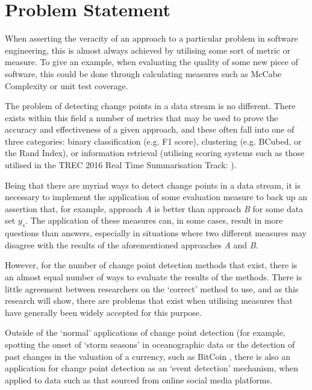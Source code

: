 \documentclass[../main.tex]{subfiles}
\begin{document}
\section{Problem Statement}
\label{Problem Statement}

When asserting the veracity of an approach to a particular problem in software engineering, this is almost always achieved by utilising some sort of metric or measure. To give an example, when evaluating the quality of some new piece of software, this could be done through calculating measures such as McCabe Complexity \cite{ThomasJ.McCabe1976} or unit test coverage.

The problem of detecting change points in a data stream is no different. There exists within this field a number of metrics that may be used to prove the accuracy and effectiveness of a given approach, and these often fall into one of three categories: binary classification (e.g. F1 score), clustering (e.g. BCubed, or the Rand Index), or information retrieval (utilising scoring systems such as those utilised in the TREC 2016 Real Time Summarisation Track: \cite{trec2016}).

Being that there are myriad ways to detect change points in a data stream, it is necessary to implement the application of some evaluation measure to back up an assertion that, for example, approach \emph{A} is better than approach \emph{B} for some data set $y_s$. The application of these measures can, in some cases, result in more questions than answers, especially in situations where two different measures may disagree with the results of the aforementioned approaches \emph{A} and \emph{B}.

However, for the number of change point detection methods that exist, there is an almost equal number of ways to evaluate the results of the methods. There is little agreement between researchers on the `correct' method to use, and as this research will show, there are problems that exist when utilising measures that have generally been widely accepted for this purpose.

Outside of the `normal' applications of change point detection (for example, spotting the onset of `storm seasons' in oceanographic data \cite{Killick2011} or the detection of past changes in the valuation of a currency, such as BitCoin \cite{Buntain2014}, there is also an application for change point detection as an `event detection' mechanism, when applied to data such as that sourced from online social media platforms.
\end{document}

